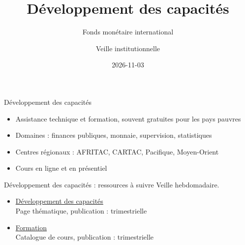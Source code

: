 \documentclass[aspectratio=169,11pt]{beamer}
\title{Développement des capacités}
\subtitle{Fonds monétaire international}
\author{Veille institutionnelle}
\date{2026-11-03}
\begin{document}
\begin{frame}\titlepage\end{frame}

\begin{frame}{Développement des capacités}
\begin{itemize}
\item Assistance technique et formation, souvent gratuites pour les pays pauvres
\item Domaines : finances publiques, monnaie, supervision, statistiques
\item Centres régionaux : AFRITAC, CARTAC, Pacifique, Moyen-Orient
\item Cours en ligne et en présentiel
\end{itemize}
\end{frame}

\begin{frame}{Développement des capacités : ressources à suivre}
\small
Veille hebdomadaire.
\begin{itemize}
\item \href{https://www.imf.org/en/Capacity-Development}{Développement des capacités}\\{\footnotesize Page thématique, publication : trimestrielle}
\item \href{https://www.imf.org/en/Capacity-Development/training}{Formation}\\{\footnotesize Catalogue de cours, publication : trimestrielle}
\end{itemize}
\end{frame}
\end{document}
